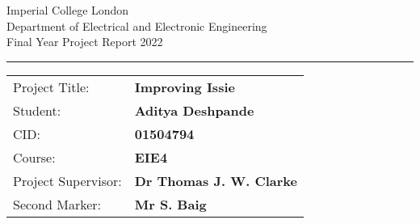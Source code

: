 \begin{titlepage}
                \setlength{\parindent}{0pt}
                \setlength{\parskip}{0pt}

                {
                                \Large
                                \raggedright
                                Imperial College London\\[17pt]
                                Department of Electrical and Electronic Engineering\\[17pt]
                                Final Year Project Report 2022\\[17pt]
 
                }

                \rule{\columnwidth}{3pt}
                \vfill
                \centering

                \setlength{\tabcolsep}{0pt}

                \begin{tabular}{p{40mm}p{\dimexpr\columnwidth-40mm}}
                                Project Title: & \textbf{Improving Issie} \\[12pt]
                                Student: & \textbf{Aditya Deshpande} \\[12pt]
                                CID: & \textbf{01504794} \\[12pt]
                                Course: & \textbf{EIE4} \\[12pt]
                                Project Supervisor: & \textbf{Dr Thomas J. W. Clarke} \\[12pt]
                                Second Marker: & \textbf{Mr S. Baig} \\
                \end{tabular}
\end{titlepage}